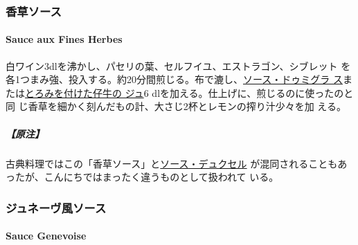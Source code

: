 \maeaki

\hypertarget{ux9999ux8349ux30bdux30fcux30b9}{%
\subsubsection{香草ソース}\label{ux9999ux8349ux30bdux30fcux30b9}}

\hypertarget{sauce-aux-fines-herbes}{%
\paragraph{Sauce aux Fines Herbes}\label{sauce-aux-fines-herbes}}

  
 

白ワイン3dlを沸かし、パセリの葉、セルフイユ、エストラゴン、シブレット
を各1つまみ強、投入する。約20分間煎じる。布で漉し、\protect\hyperlink{sauce-demi-glace}{ソース・ドゥミグラ
ス}または\protect\hyperlink{jus-de-veau-lie}{とろみを付けた仔牛の ジュ}6
dlを加える。仕上げに、煎じるのに使ったのと同
じ香草を細かく刻んだもの計、大さじ2\undemi{}杯とレモンの搾り汁少々を加
える。

\hypertarget{ux539fux6ce8-2}{%
\subparagraph{【原注】}\label{ux539fux6ce8-2}}

古典料理ではこの「香草ソース」と\protect\hyperlink{sauce-duxelles}{ソース・デュクセル}
が混同されることもあったが、こんにちではまったく違うものとして扱われて
いる。

\maeaki

\hypertarget{ux30b8ux30e5ux30cdux30fcux30f4ux98a8ux30bdux30fcux30b9}{%
\subsubsection{ジュネーヴ風ソース}\label{ux30b8ux30e5ux30cdux30fcux30f4ux98a8ux30bdux30fcux30b9}}

\hypertarget{sauce-genevoise}{%
\paragraph{Sauce Genevoise}\label{sauce-genevoise}}

   

